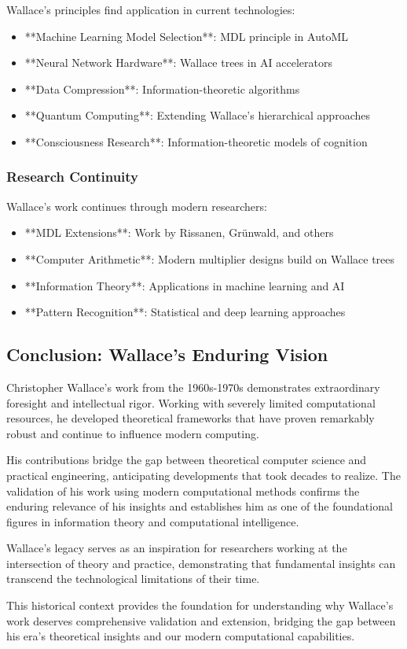Wallace's principles find application in current technologies:

\begin{itemize}
    \item **Machine Learning Model Selection**: MDL principle in AutoML
    \item **Neural Network Hardware**: Wallace trees in AI accelerators
    \item **Data Compression**: Information-theoretic algorithms
    \item **Quantum Computing**: Extending Wallace's hierarchical approaches
    \item **Consciousness Research**: Information-theoretic models of cognition
\end{itemize}

\subsubsection{Research Continuity}

Wallace's work continues through modern researchers:

\begin{itemize}
    \item **MDL Extensions**: Work by Rissanen, Grünwald, and others
    \item **Computer Arithmetic**: Modern multiplier designs build on Wallace trees
    \item **Information Theory**: Applications in machine learning and AI
    \item **Pattern Recognition**: Statistical and deep learning approaches
\end{itemize}

\subsection{Conclusion: Wallace's Enduring Vision}

Christopher Wallace's work from the 1960s-1970s demonstrates extraordinary foresight and intellectual rigor. Working with severely limited computational resources, he developed theoretical frameworks that have proven remarkably robust and continue to influence modern computing.

His contributions bridge the gap between theoretical computer science and practical engineering, anticipating developments that took decades to realize. The validation of his work using modern computational methods confirms the enduring relevance of his insights and establishes him as one of the foundational figures in information theory and computational intelligence.

Wallace's legacy serves as an inspiration for researchers working at the intersection of theory and practice, demonstrating that fundamental insights can transcend the technological limitations of their time.

This historical context provides the foundation for understanding why Wallace's work deserves comprehensive validation and extension, bridging the gap between his era's theoretical insights and our modern computational capabilities.
